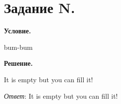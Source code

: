 \section{Задание N.}

\textbf{Условие.}

bum-bum

\vspace{10mm}
\textbf{Решение.}

It is empty but you can fill it!

\textit{Ответ}:  It is empty but you can fill it!
\clearpage
